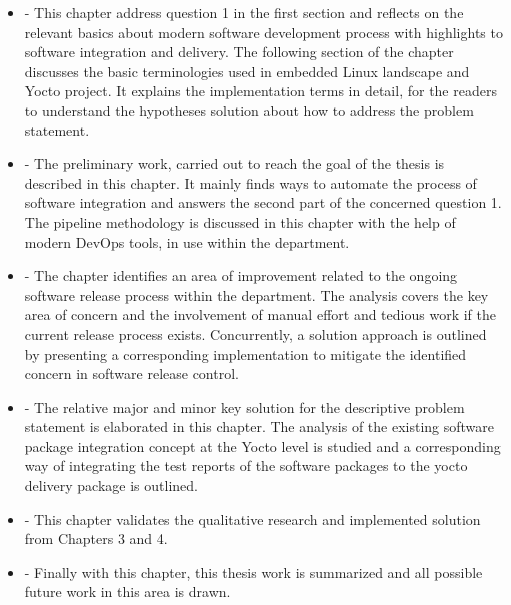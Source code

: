   
\begin{itemize}
\item {} - This chapter address question 1 in the first section and reflects on the relevant basics about modern software development process with highlights to software integration and delivery. The following section of the chapter discusses the basic terminologies used in embedded Linux landscape and Yocto project. It explains the implementation terms in detail, for the readers to understand the hypotheses solution about how to address the problem statement.


\item {} - The preliminary work, carried out to reach the goal of the thesis is described in this chapter. It mainly finds ways to automate the process of software integration and answers the second part of the concerned question 1. The pipeline methodology is discussed in this chapter with the help of modern DevOps tools, in use within the department. 

\item  {} - The chapter identifies an area of improvement related to the ongoing software release process within the department. The analysis covers the key area of concern and the involvement of manual effort and tedious work if the current release process exists. Concurrently, a solution approach is outlined by presenting a corresponding implementation to mitigate the identified concern in software release control. 

\item  {} - The relative major and minor key solution for the descriptive problem statement is elaborated in this chapter. The analysis of the existing software package integration concept at the Yocto level is studied and a corresponding way of integrating the test reports of the software packages to the yocto delivery package is outlined.

\item {} - This chapter validates the qualitative research and implemented solution from Chapters 3 and 4.

\item {} - Finally with this chapter, this thesis work is summarized and all possible future work in this area is drawn.


\end{itemize}

